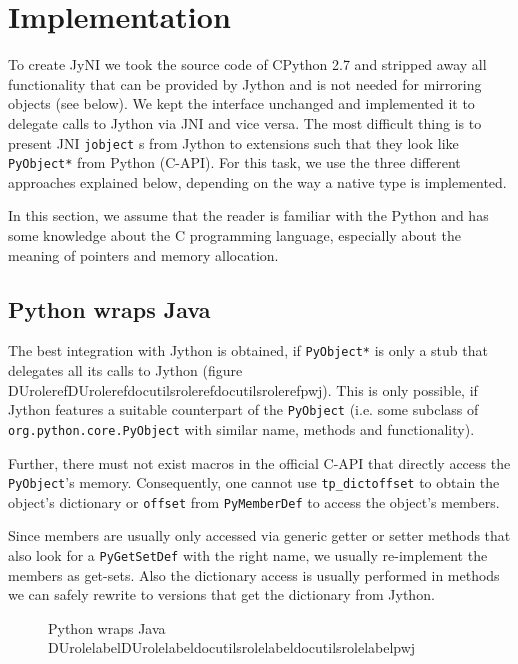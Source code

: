 \documentclass[letterpaper,compsoc,twoside]{IEEEtran}
\providecommand*{\DUrole}[2]{\ifcsname DUrole#1\endcsname \csname DUrole#1\endcsname{#2}\else \ifcsname docutilsrole#1\endcsname \csname docutilsrole#1\endcsname{#2}\else #2\fi \fi }
\begin{document}
\section{Implementation\label{implementation}}


To create JyNI we took the source code of CPython 2.7 and stripped away all functionality that can be provided by Jython and is not needed for mirroring objects (see below). We kept the interface unchanged and implemented it to delegate calls to Jython via JNI and vice versa.
The most difficult thing is to present JNI \texttt{jobject} s from Jython to extensions such that they look like \texttt{PyObject*} from Python (C-API). For this task, we use the three different approaches explained below, depending on the way a native type is implemented.

In this section, we assume that the reader is familiar with the Python \cite{C-API} and has some knowledge about the C programming language, especially about the meaning of pointers and memory allocation.

\subsection{Python wraps Java\label{python-wraps-java}}


The best integration with Jython is obtained, if \texttt{PyObject*} is only a stub that
delegates all its calls to Jython (figure \DUrole{ref}{pwj}). This is only possible, if Jython features a
suitable counterpart of the \texttt{PyObject} (i.e. some subclass of \texttt{org.python.core.PyObject}
with similar name, methods and functionality).

Further, there must not exist macros
in the official C-API that directly access the \texttt{PyObject}'s memory. Consequently, one
cannot use \texttt{tp\_dictoffset} to obtain the object's dictionary or \texttt{offset} from
\texttt{PyMemberDef} to access the object's members.

Since members are usually only accessed via generic
getter or setter methods that also look for a \texttt{PyGetSetDef} with the right name, we usually re-implement
the members as get-sets. Also the dictionary access is usually performed in methods we can safely
rewrite to versions that get the dictionary from Jython.\begin{figure}[]\noindent{}
\caption{Python wraps Java \DUrole{label}{pwj}}
\end{figure}
\end{document}
